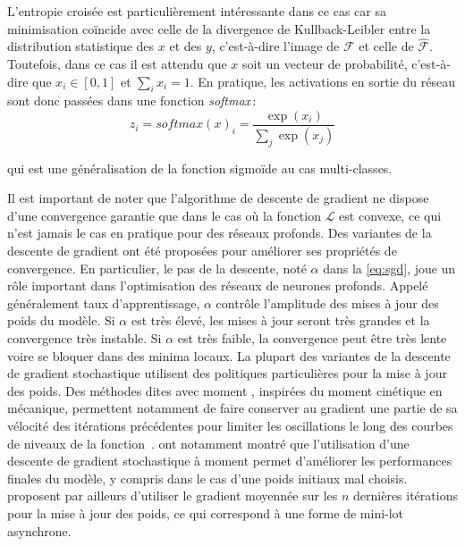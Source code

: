 L'entropie croisée est particulièrement intéressante dans ce cas car sa minimisation coïncide avec celle de la divergence de Kullback-Leibler entre la distribution statistique des $x$ et des $y$, c'est-à-dire l'image de $\mathcal{F}$ et celle de $\hat{\mathcal{F}}$. Toutefois, dans ce cas il est attendu que $x$ soit un vecteur de probabilité, c'est-à-dire que $x_i \in [0,1]$ et $\sum_i x_i = 1$. En pratique, les activations en sortie du réseau sont donc passées dans une fonction \emph{softmax}\,:
\begin{equation}
z_i = \mathit{softmax}(x)_i = \frac{\exp(x_i)}{\sum_j \exp(x_j)}
\end{equation}

qui est une généralisation de la fonction sigmoïde au cas multi-classes.

Il est important de noter que l'algorithme de descente de gradient ne dispose d'une convergence garantie que dans le cas où la fonction $\mathcal{L}$ est convexe, ce qui n'est jamais le cas en pratique pour des réseaux profonds. Des variantes de la descente de gradient ont été proposées pour améliorer ses propriétés de convergence. En particulier, le pas de la descente, noté $\alpha$ dans la \cref{eq:sgd}, joue un rôle important dans l'optimisation des réseaux de neurones profonds. Appelé généralement taux d'apprentissage, $\alpha$ contrôle l'amplitude des mises à jour des poids du modèle. Si $\alpha$ est très élevé, les mises à jour seront très grandes et la convergence très instable. Si $\alpha$ est très faible, la convergence peut être très lente voire se bloquer dans des minima locaux. La plupart des variantes de la descente de gradient stochastique utilisent des politiques particulières pour la mise à jour des poids. Des méthodes dites avec \og moment \fg, inspirées du moment cinétique en mécanique, permettent notamment de faire conserver au gradient une partie de sa vélocité des itérations précédentes pour limiter les oscillations le long des courbes de niveaux de la fonction~\cite{qian_momentum_1999,nesterov_method_1983}. \citet{sutskever_importance_2013} ont notamment montré que l'utilisation d'une descente de gradient stochastique à moment permet d'améliorer les performances finales du modèle, y compris dans le cas d'une poids initiaux mal choisis. \citet{polyak_acceleration_1992} proposent par ailleurs d'utiliser le gradient moyennée sur les $n$ dernières itérations pour la mise à jour des poids, ce qui correspond à une forme de mini-lot asynchrone.

